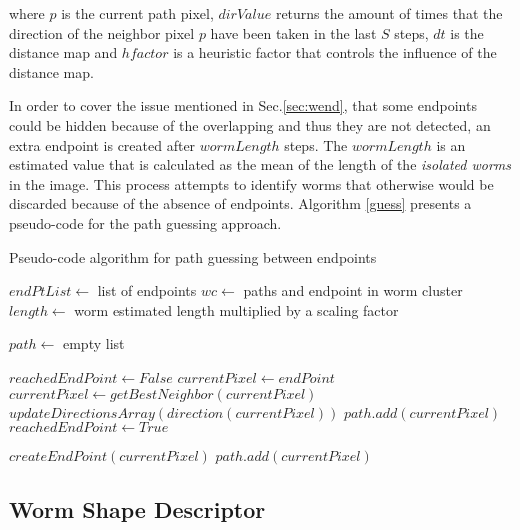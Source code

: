 where $p$ is the current path pixel, $dirValue$ returns the amount of times that the 
direction of the neighbor pixel $p$ have been taken in the last $S$ steps, $dt$ is the 
distance map and $hfactor$ is a heuristic factor that controls the influence of the
distance map.

In order to cover the issue mentioned in Sec.\ref{sec:wend}, that some endpoints could
be hidden because of the overlapping and thus they are not detected, an extra endpoint is created after $wormLength$ steps.
The $wormLength$ is an estimated value that is calculated
as the mean of the length of the \emph{isolated worms} in the image. This process
attempts to identify worms that otherwise would be discarded because of the absence
of endpoints. Algorithm \ref{guess} presents a pseudo-code for the path
guessing approach.

\begin{algorithm}                     
\caption{Pseudo-code algorithm for path guessing between endpoints}         
\label{guess}                    
\begin{algorithmic}                   

\STATE $endPtList \leftarrow$ list of endpoints
\STATE $wc \leftarrow$ paths and endpoint in worm cluster 
\STATE $length \leftarrow$ worm estimated length multiplied by a scaling factor
\STATE {}
\ENDIF
{}

\STATE $path \leftarrow$ empty list

\STATE $reachedEndPoint \leftarrow False$
\STATE $currentPixel \leftarrow endPoint$
\STATE $currentPixel \leftarrow getBestNeighbor(currentPixel)$
\STATE $updateDirectionsArray(direction(currentPixel))$
\STATE $path.add(currentPixel)$
\STATE $reachedEndPoint \leftarrow True$
\ENDIF
\ENDWHILE 

\STATE $createEndPoint(currentPixel)$
\STATE $path.add(currentPixel)$
\ELSE
\STATE {}
\ENDIF
\ENDIF
\ENDFOR

\end{algorithmic}
\end{algorithm}

\subsection{Worm Shape Descriptor}
\label{sec:metshapedescriptor}

